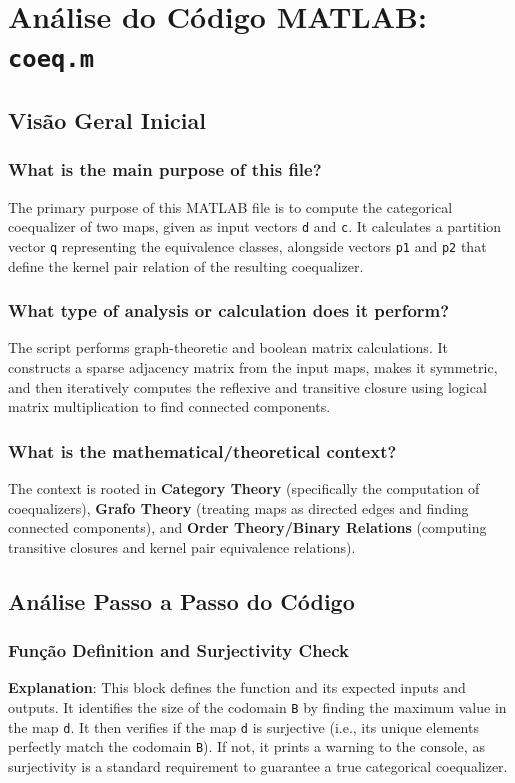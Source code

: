 
\chapter{Análise do Código MATLAB: \texttt{coeq.m}}
\section{Visão Geral Inicial}

\subsection*{What is the main purpose of this file?}
The primary purpose of this MATLAB file is to compute the categorical coequalizer of two maps, given as input vectors \texttt{d} and \texttt{c}. It calculates a partition vector \texttt{q} representing the equivalence classes, alongside vectors \texttt{p1} and \texttt{p2} that define the kernel pair relation of the resulting coequalizer.

\subsection*{What type of analysis or calculation does it perform?}
The script performs graph-theoretic and boolean matrix calculations. It constructs a sparse adjacency matrix from the input maps, makes it symmetric, and then iteratively computes the reflexive and transitive closure using logical matrix multiplication to find connected components.

\subsection*{What is the mathematical/theoretical context?}
The context is rooted in \textbf{Category Theory} (specifically the computation of coequalizers), \textbf{Grafo Theory} (treating maps as directed edges and finding connected components), and \textbf{Order Theory/Binary Relations} (computing transitive closures and kernel pair equivalence relations). 
\section{Análise Passo a Passo do Código}

\subsection{Função Definition and Surjectivity Check}
\textbf{Explanation}: This block defines the function and its expected inputs and outputs. It identifies the size of the codomain \texttt{B} by finding the maximum value in the map \texttt{d}. It then verifies if the map \texttt{d} is surjective (i.e., its unique elements perfectly match the codomain \texttt{B}). If not, it prints a warning to the console, as surjectivity is a standard requirement to guarantee a true categorical coequalizer.

